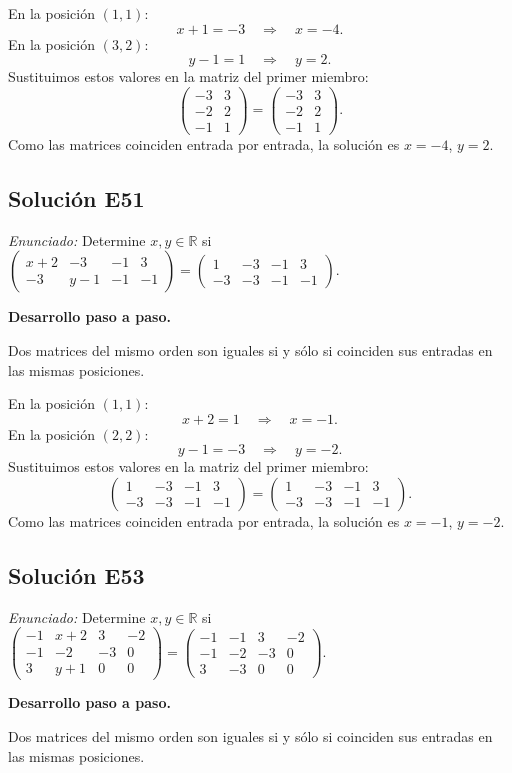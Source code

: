 \documentclass[12pt]{article}
\theoremstyle{remark}
\newcommand{\solucion}[2]{\Needspace{11\baselineskip}\subsection*{Solución E#1}\noindent\textit{Enunciado:} #2\par\medskip\noindent\textbf{Desarrollo paso a paso.}\par\medskip}
\begin{document}
En la posición $(1,1)$:
\[
x + 1=-3\quad\Longrightarrow\quad x=-4.
\]
En la posición $(3,2)$:
\[
y - 1=1\quad\Longrightarrow\quad y=2.
\]
Sustituimos estos valores en la matriz del primer miembro:
\[
\begin{pmatrix}-3&3\\-2&2\\-1&1\end{pmatrix}=\begin{pmatrix}-3&3\\-2&2\\-1&1\end{pmatrix}.
\]
Como las matrices coinciden entrada por entrada, la solución es $x=-4$, $y=2$.


\medskip

\solucion{51}{Determine $x,y\in\mathbb R$ si $\begin{pmatrix}x + 2&-3&-1&3\\-3&y - 1&-1&-1\end{pmatrix}=\begin{pmatrix}1&-3&-1&3\\-3&-3&-1&-1\end{pmatrix}$.}
Dos matrices del mismo orden son iguales si y sólo si coinciden sus entradas en las mismas posiciones.

En la posición $(1,1)$:
\[
x + 2=1\quad\Longrightarrow\quad x=-1.
\]
En la posición $(2,2)$:
\[
y - 1=-3\quad\Longrightarrow\quad y=-2.
\]
Sustituimos estos valores en la matriz del primer miembro:
\[
\begin{pmatrix}1&-3&-1&3\\-3&-3&-1&-1\end{pmatrix}=\begin{pmatrix}1&-3&-1&3\\-3&-3&-1&-1\end{pmatrix}.
\]
Como las matrices coinciden entrada por entrada, la solución es $x=-1$, $y=-2$.


\medskip

\solucion{53}{Determine $x,y\in\mathbb R$ si $\begin{pmatrix}-1&x + 2&3&-2\\-1&-2&-3&0\\3&y + 1&0&0\end{pmatrix}=\begin{pmatrix}-1&-1&3&-2\\-1&-2&-3&0\\3&-3&0&0\end{pmatrix}$.}
Dos matrices del mismo orden son iguales si y sólo si coinciden sus entradas en las mismas posiciones.
\end{document}
